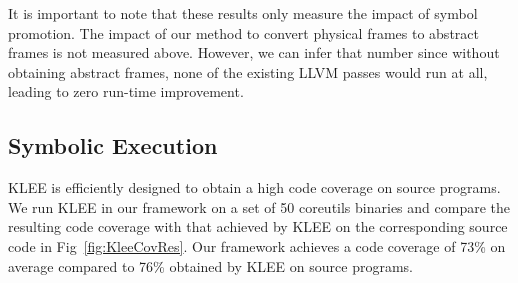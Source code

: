 It is important to note that these results only measure the impact of symbol promotion. The impact of our method to convert physical frames to abstract frames is not measured above. However, we can infer that number since without obtaining abstract frames, none of the existing LLVM passes would run at all, leading to zero run-time improvement.	



\subsection{Symbolic Execution}

%
KLEE is efficiently designed to obtain a high code coverage on source programs. We run KLEE in our framework on a set of 50 coreutils binaries and compare the resulting code coverage with that achieved by KLEE on the corresponding source code in Fig~\ref{fig:KleeCovRes}. Our framework achieves a code coverage of 73\% on average compared to 76\% obtained by KLEE on source programs. 


